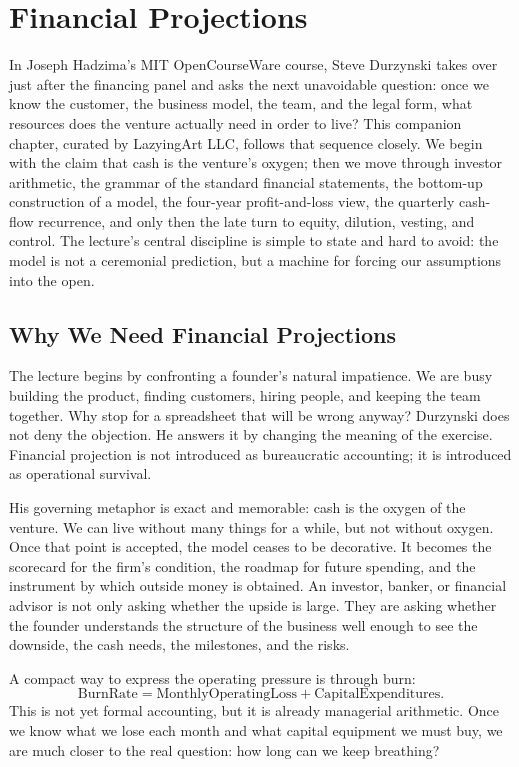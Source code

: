\chapter{Financial Projections}

In Joseph Hadzima's MIT OpenCourseWare course, Steve Durzynski takes over just after the financing panel and asks the next unavoidable question: once we know the customer, the business model, the team, and the legal form, what resources does the venture actually need in order to live? This companion chapter, curated by LazyingArt LLC, follows that sequence closely. We begin with the claim that cash is the venture's oxygen; then we move through investor arithmetic, the grammar of the standard financial statements, the bottom-up construction of a model, the four-year profit-and-loss view, the quarterly cash-flow recurrence, and only then the late turn to equity, dilution, vesting, and control. The lecture's central discipline is simple to state and hard to avoid: the model is not a ceremonial prediction, but a machine for forcing our assumptions into the open.

\section{Why We Need Financial Projections}

The lecture begins by confronting a founder's natural impatience. We are busy building the product, finding customers, hiring people, and keeping the team together. Why stop for a spreadsheet that will be wrong anyway? Durzynski does not deny the objection. He answers it by changing the meaning of the exercise. Financial projection is not introduced as bureaucratic accounting; it is introduced as operational survival.

His governing metaphor is exact and memorable: cash is the oxygen of the venture. We can live without many things for a while, but not without oxygen. Once that point is accepted, the model ceases to be decorative. It becomes the scorecard for the firm's condition, the roadmap for future spending, and the instrument by which outside money is obtained. An investor, banker, or financial advisor is not only asking whether the upside is large. They are asking whether the founder understands the structure of the business well enough to see the downside, the cash needs, the milestones, and the risks.

A compact way to express the operating pressure is through burn:
\begin{equation}
\mathrm{BurnRate} = \mathrm{MonthlyOperatingLoss} + \mathrm{CapitalExpenditures}.
\end{equation}
This is not yet formal accounting, but it is already managerial arithmetic. Once we know what we lose each month and what capital equipment we must buy, we are much closer to the real question: how long can we keep breathing?

